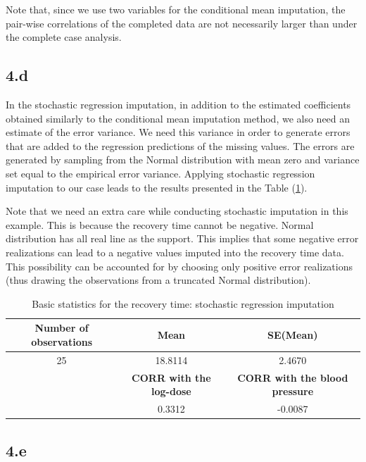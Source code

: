 \documentclass{article}
\begin{document}
Note that, since we use two variables for the conditional mean imputation, the pair-wise correlations of the completed data are not necessarily larger than under the complete case analysis. 

\subsection*{4.d}

In the stochastic regression imputation, in addition to the estimated coefficients obtained similarly to the conditional mean imputation method, we also need an estimate of the error variance. We need this variance in order to generate errors that are added to the regression predictions of the missing values. The errors are generated by sampling from the Normal distribution with mean zero and variance set equal to the empirical error variance. Applying stochastic regression imputation to our case leads to the results presented in the Table (\ref{Tab_4}).

Note that we need an extra care while conducting stochastic imputation in this example. This is because the recovery time cannot be negative. Normal distribution has all real line as the support. This implies that some negative error realizations can lead to a negative values imputed into the recovery time data. This possibility can be accounted for by choosing only positive error realizations (thus drawing the observations from a truncated Normal distribution). 


\begin{table}[H]
\caption{Basic statistics for the recovery time: stochastic regression imputation}
\label{Tab_4}
\begin{tabular}{|c |c| c|}

\hline
\hline
 \textbf{Number of observations} & \textbf{Mean} &\textbf{SE(Mean)} \\[2ex]
\hline
25 &18.8114 &2.4670 \\
\hline
 &\textbf{CORR with the log-dose} &\textbf{CORR with the blood pressure} \\[2ex] 
\hline
 &0.3312 &-0.0087 \\
\hline
\hline

\end{tabular}
\end{table}

\subsection*{4.e}
\end{document}
